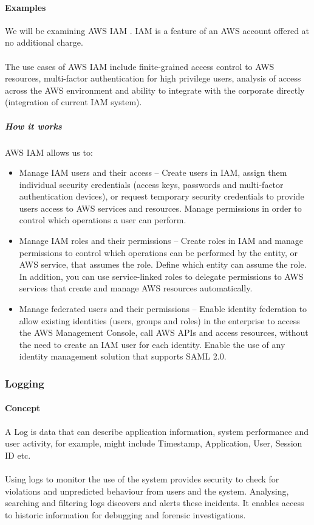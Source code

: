 \documentclass[10pt]{article}
\begin{document}
\paragraph{Examples}
We will be examining AWS IAM \cite{aws-iam}. IAM is a feature of an AWS account offered at no additional charge. 
\\ \\
The use cases of AWS IAM include finite-grained access control to AWS resources, multi-factor authentication for high privilege users, analysis of access across the AWS environment and ability to integrate with the corporate directly (integration of current IAM system). 
\subparagraph{How it works}
AWS IAM allows us to:
\begin{itemize}
    \item Manage IAM users and their access –  Create users in IAM, assign them individual security credentials (access keys, passwords and multi-factor authentication devices), or request temporary security credentials to provide users access to AWS services and resources. Manage permissions in order to control which operations a user can perform.
    \item Manage IAM roles and their permissions – Create roles in IAM and manage permissions to control which operations can be performed by the entity, or AWS service, that assumes the role. Define which entity can assume the role. In addition, you can use service-linked roles to delegate permissions to AWS services that create and manage AWS resources automatically.
    \item Manage federated users and their permissions – Enable identity federation to allow existing identities (users, groups and roles) in the enterprise to access the AWS Management Console, call AWS APIs and access resources, without the need to create an IAM user for each identity. Enable the use of any identity management solution that supports SAML 2.0.
\end{itemize}

\subsubsection{Logging}
\paragraph{Concept}
A Log is data that can describe application information, system performance and user activity, for example, might include Timestamp, Application, User, Session ID etc.
\\ \\
Using logs to monitor the use of the system provides security to check for violations and unpredicted behaviour from users and the system. Analysing, searching and filtering logs discovers and alerts these incidents. It enables access to historic information for debugging and forensic investigations. \cite{logs}
\end{document}
